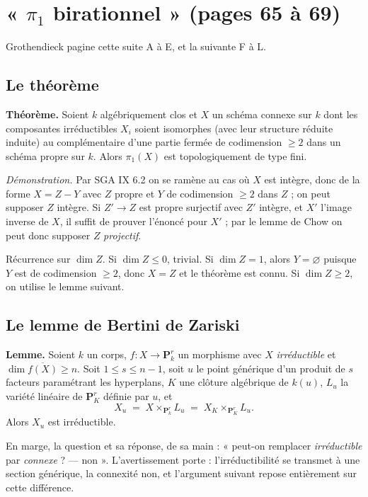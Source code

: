 \documentclass[11pt,a4paper]{article}
\begin{document}
\section*{« $\pi_{1}$ birationnel » (pages 65 à 69)}

Grothendieck pagine cette suite A à E, et la suivante F à L.

\subsection*{Le théorème}

\textbf{Théorème.} Soient $k$ algébriquement clos et $X$ un schéma connexe sur
$k$ dont les composantes irréductibles $X_{i}$ soient isomorphes (avec leur
structure réduite induite) au complémentaire d'une partie fermée de
codimension $\geqslant 2$ dans un schéma propre sur $k$. Alors $\pi_{1}(X)$ est
topologiquement de type fini.

\emph{Démonstration.} Par SGA IX 6.2 on se ramène au cas où $X$ est intègre,
donc de la forme $X = Z - Y$ avec $Z$ propre et $Y$ de codimension $\geqslant 2$
dans $Z$ ; on peut supposer $Z$ intègre. Si $Z' \to Z$ est propre surjectif avec
$Z'$ intègre, et $X'$ l'image inverse de $X$, il suffit de prouver l'énoncé pour
$X'$ ; par le lemme de Chow on peut donc supposer $Z$ \emph{projectif}.

Récurrence sur $\dim Z$. Si $\dim Z \leqslant 0$, trivial. Si $\dim Z = 1$,
alors $Y = \varnothing$ puisque $Y$ est de codimension $\geqslant 2$, donc
$X = Z$ et le théorème est connu. Si $\dim Z \geqslant 2$, on utilise le lemme
suivant.

\subsection*{Le lemme de Bertini de Zariski}

\textbf{Lemme.} Soient $k$ un corps, $f : X \to \mathbf{P}^{r}_{k}$ un
morphisme avec $X$ \emph{irréductible} et $\dim \overline{f(X)} \geqslant n$.
Soit $1 \leqslant s \leqslant n-1$, soit $u$ le point générique d'un produit de
$s$ facteurs paramétrant les hyperplans, $K$ une clôture algébrique de $k(u)$,
$L_{u}$ la variété linéaire de $\mathbf{P}^{r}_{K}$ définie par $u$, et
\[
  X_{u} \;=\; X \times_{\mathbf{P}^{r}_{k}} L_{u}
        \;=\; X_{K} \times_{\mathbf{P}^{r}_{K}} L_{u} .
\]
Alors $X_{u}$ est irréductible.

En marge, la question et sa réponse, de sa main : « peut-on remplacer
\emph{irréductible} par \emph{connexe} ? --- non ». L'avertissement porte :
l'irréductibilité se transmet à une section générique, la connexité non, et
l'argument suivant repose entièrement sur cette différence.
\end{document}

